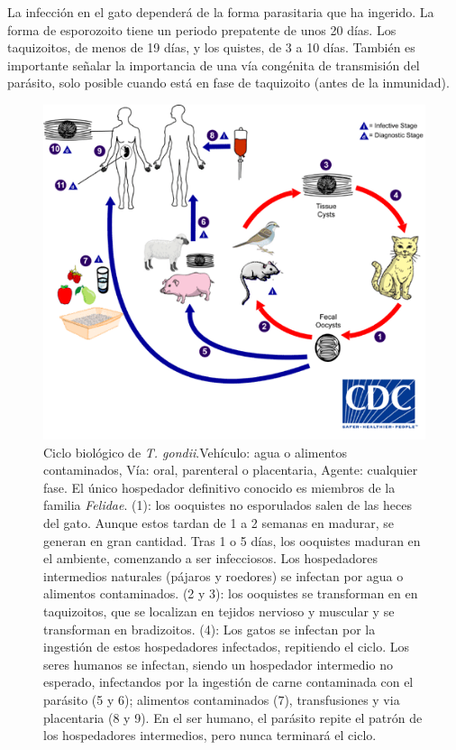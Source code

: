 La infección en el gato dependerá de la forma parasitaria que ha ingerido. La forma de esporozoito tiene un periodo prepatente de unos 20 días. Los taquizoitos, de menos de 19 días, y los quistes, de 3 a 10 días. También es importante señalar la importancia de una vía congénita de transmisión del parásito, solo posible cuando está en fase de taquizoito (antes de la inmunidad).
\begin{figure}[H]
	\centering
	\includegraphics[width=0.7\columnwidth]{A.imagenes/ACV-BioSan-Parasit-TgondiiCbios}
	\caption[Ciclo biológico de \textit{T. gondii}]{Ciclo biológico de \textit{T. gondii}.Vehículo: agua o alimentos contaminados, Vía: oral, parenteral o placentaria, Agente: cualquier fase. El único hospedador definitivo conocido es miembros de la familia \textit{Felidae}. (1): los ooquistes no esporulados salen de las heces del gato. Aunque estos tardan de 1 a 2 semanas en madurar, se generan en gran cantidad. Tras 1 o 5 días, los ooquistes maduran en el ambiente, comenzando a ser infecciosos. Los hospedadores intermedios naturales (pájaros y roedores) se infectan por agua o alimentos contaminados. (2 y 3): los ooquistes se transforman en en taquizoitos, que se localizan en tejidos nervioso y muscular y se transforman en bradizoitos. (4): Los gatos se infectan por la ingestión de estos hospedadores infectados, repitiendo el ciclo. Los seres humanos se infectan, siendo un hospedador intermedio no esperado, infectandos por la ingestión de carne contaminada con el parásito (5 y 6); alimentos contaminados (7), transfusiones y via placentaria (8 y 9). En el ser humano, el parásito repite el patrón de los hospedadores intermedios, pero nunca terminará el ciclo.}
\end{figure}
